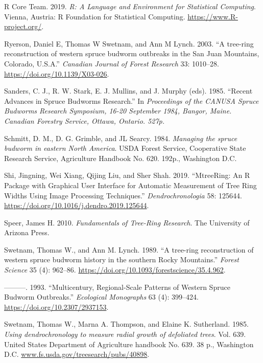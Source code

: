 \documentclass[review]{elsarticle} %
\begin{document}
\leavevmode\hypertarget{ref-RCore}{}%
R Core Team. 2019. \emph{R: A Language and Environment for Statistical Computing}. Vienna, Austria: R Foundation for Statistical Computing. \url{https://www.R-project.org/}.

\leavevmode\hypertarget{ref-Ryerson2003}{}%
Ryerson, Daniel E, Thomas W Swetnam, and Ann M Lynch. 2003. ``A tree-ring reconstruction of western spruce budworm outbreaks in the San Juan Mountains, Colorado, U.S.A.'' \emph{Canadian Journal of Forest Research} 33: 1010--28. \url{https://doi.org/10.1139/X03-026}.

\leavevmode\hypertarget{ref-Sanders1985}{}%
Sanders, C. J., R. W. Stark, E. J. Mullins, and J. Murphy (eds). 1985. ``Recent Advances in Spruce Budworms Research.'' In \emph{Proceedings of the CANUSA Spruce Budworms Research Symposium, 16-20 September 1984, Bangor, Maine. Canadian Forestry Service, Ottawa, Ontario. 527p.}

\leavevmode\hypertarget{ref-Schmitt1984}{}%
Schmitt, D. M., D. G. Grimble, and JL Searcy. 1984. \emph{Managing the spruce budworm in eastern North America}. USDA Forest Service, Cooperative State Research Service, Agriculture Handbook No. 620. 192p., Washington D.C.

\leavevmode\hypertarget{ref-Shi2019}{}%
Shi, Jingning, Wei Xiang, Qijing Liu, and Sher Shah. 2019. ``MtreeRing: An R Package with Graphical User Interface for Automatic Measurement of Tree Ring Widths Using Image Processing Techniques.'' \emph{Dendrochronologia} 58: 125644. \url{https://doi.org/10.1016/j.dendro.2019.125644}.

\leavevmode\hypertarget{ref-Speer2010}{}%
Speer, James H. 2010. \emph{Fundamentals of Tree-Ring Research}. The University of Arizona Press.

\leavevmode\hypertarget{ref-Swetnam1989}{}%
Swetnam, Thomas W., and Ann M. Lynch. 1989. ``A tree-ring reconstruction of western spruce budworm history in the southern Rocky Mountains.'' \emph{Forest Science} 35 (4): 962--86. \url{https://doi.org/10.1093/forestscience/35.4.962}.

\leavevmode\hypertarget{ref-Swetnam1993}{}%
---------. 1993. ``Multicentury, Regional-Scale Patterns of Western Spruce Budworm Outbreaks.'' \emph{Ecological Monographs} 63 (4): 399--424. \url{https://doi.org/10.2307/2937153}.

\leavevmode\hypertarget{ref-Swetnam1985}{}%
Swetnam, Thomas W., Marna A. Thompson, and Elaine K. Sutherland. 1985. \emph{Using dendrochronology to measure radial growth of defoliated trees}. Vol. 639. United States Department of Agriculture handbook No. 639. 38 p., Washington D.C. \url{www.fs.usda.gov/treesearch/pubs/40898}.
\end{document}
